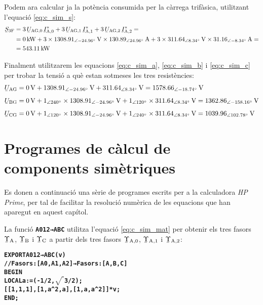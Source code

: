 \begin{exemple}
    Podem ara  calcular ja  la potència consumida per la càrrega
    trifàsica, utilitzant l'equació \eqref{eq:c_sim_s}:
    \[
    \begin{split}
    \cmplx{S}\ped{3F} &=  3\,
    \cmplx{U}\ped{AG,0}\,  \cmplx{I}\ped{A,0}^* +
    3\, \cmplx{U}\ped{AG,1}\,
    \cmplx{I}\ped{A,1}^* + 3\, \cmplx{U}\ped{AG,2}\,
    \cmplx{I}\ped{A,2}^*  = \\
    &= \SI{0}{kW} + 3 \times \SIpd{1308,91}{-24,96}{V} \times
    \SIpd{130,89}{24,96}{A} + 3 \times
    \SIpd{311,64}{8,34}{V} \times \SIpd{31,16}{-8,34}{A} = \\
    &= \SI{543,11}{kW}
    \end{split}
    \]

    Finalment utilitzarem les equacions \eqref{eq:c_sim_a},
    \eqref{eq:c_sim_b} i \eqref{eq:c_sim_c} per trobar la tensió a què
    estan sotmeses les tres resistències:
    \begin{align*}
        \cmplx{U}\ped{AG} &= \SI{0}{V} + \SIpd{1308,91}{-24,96}{V} +
        \SIpd{311,64}{8,34}{V}  =
        \SIpd{1578,66}{-18,74}{V} \\[1ex]
        \cmplx{U}\ped{BG} &= \SI{0}{V} + \numpd{1}{240} \times
        \SIpd{1308,91}{-24,96}{V} +
        \numpd{1}{120} \times
        \SIpd{311,64}{8,34}{V}  =
        \SIpd{1362,86}{-158,16}{V}    \\[1ex]
        \cmplx{U}\ped{CG} &= \SI{0}{V} + \numpd{1}{120} \times
        \SIpd{1308,91}{-24,96}{V} +
        \numpd{1}{240} \times \SIpd{311,64}{8,34}{V}  =
        \SIpd{1039,96}{102,78}{V}
    \end{align*}
\end{exemple}

\section{Programes de càlcul de components simètriques}\label{sec:calcul-comp-sim}

Es donen a continuació una sèrie de programes escrits per a la calculadora \emph{HP Prime},
 per tal de facilitar la resolució numèrica de les equacions que han aparegut en aquest capítol.

La funció \texttt{\textbf{A012→ABC}} utilitza l'equació \eqref{eq:c_sim_mat} per obtenir els tres fasors
$\cmplx{\Upsilon}\ped{A}$, $\cmplx{\Upsilon}\ped{B}$ i $\cmplx{\Upsilon}\ped{C}$  a partir dels tres fasors
$\cmplx{\Upsilon}\ped{A,0}$, $\cmplx{\Upsilon}\ped{A,1}$ i  $\cmplx{\Upsilon}\ped{A,2}$:
\vspace{-6mm}
\begin{alltt}
\bfseries
    EXPORT A012→ABC(v)
    // Fasors:[A0,A1,A2] → Fasors:[A,B,C]
    BEGIN
      LOCAL a:=(-1/2,\(\sqrt{\phantom{|}}\)3/2);
      [[1,1,1],[1,a^2,a],[1,a,a^2]]*v;
    END;
\end{alltt}

